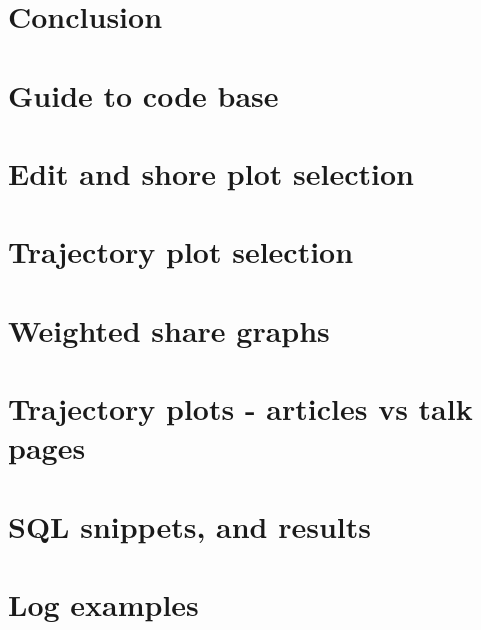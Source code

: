 \documentclass[a4paper,11pt,twoside]{report}
\begin{document}
\chapter{Conclusion}
\label{ch:conclusions}





{}
\printbibliography    

\appendix

\begin{appendices}
\chapter{Guide to code base}
\label{sec:dirtree}

\chapter{Edit and shore plot selection}
\label{sec:edit-share}

\chapter{Trajectory plot selection}

\label{sec:traj-article-talk}
\chapter{Weighted share graphs}
\label{sec:LudvigFadeev}
\chapter{Trajectory plots - articles vs talk pages}

\chapter{SQL snippets, and results}
\label{sec:sql-things}

\chapter{Log examples}
\label{sec:appendix-debug}

\end{appendices}
 
\end{document}
